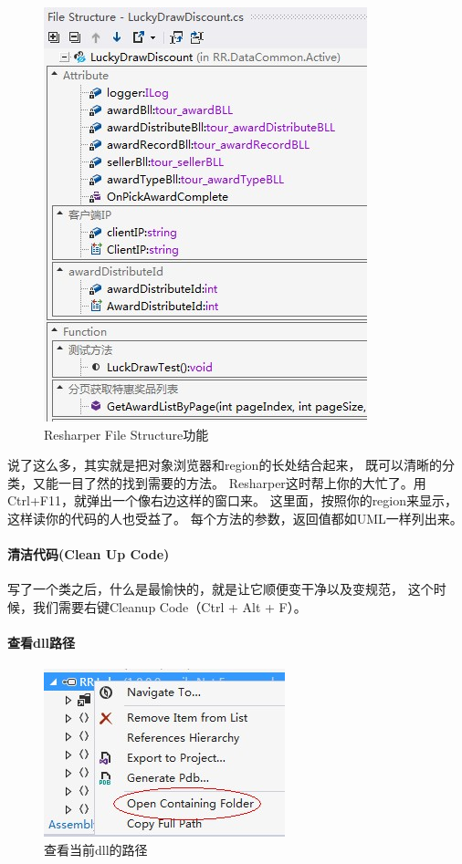 \documentclass{book}
\begin{document}
\begin{figure}[htbp]
	\centering
	\includegraphics[scale=0.6]{ResharperFileStructure.jpg}
	\caption{Resharper File Structure功能}
	\label{fig:ResharperFileStructure}
\end{figure}

说了这么多，其实就是把对象浏览器和region的长处结合起来，
既可以清晰的分类，又能一目了然的找到需要的方法。
Resharper这时帮上你的大忙了。用Ctrl+F11，就弹出一个像右边这样的窗口来。
这里面，按照你的region来显示，这样读你的代码的人也受益了。
每个方法的参数，返回值都如UML一样列出来。

\paragraph{清洁代码(Clean Up Code)}

写了一个类之后，什么是最愉快的，就是让它顺便变干净以及变规范，
这个时候，我们需要右键Cleanup Code（Ctrl + Alt + F）。

\paragraph{查看dll路径}

\begin{figure}[htbp]
	\centering
	\includegraphics[scale=0.6]{ExploreDllFullPath.jpg}
	\caption{查看当前dll的路径}
	\label{fig:ExploreDllFullPath}
\end{figure}
\end{document}
